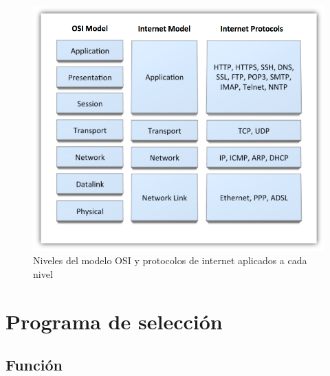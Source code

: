\begin{figure}
\centering
\includegraphics[scale = 0.5]{capitulo_02/figuras_dir/OSI.jpg}
\caption{Niveles del modelo OSI y protocolos de internet aplicados a cada nivel}
\end{figure}





































\section{Programa de selección} \label{s2_4}

\subsection{Función} \label{s2_4_1}

